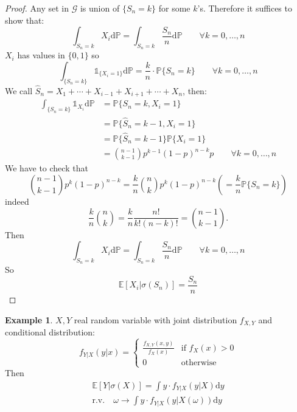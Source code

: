 \documentclass[10pt,a4paper]{article}
\theoremstyle{definition}
\newtheorem{exi}{Example}[section]
\newcommand{\ind}{\mathds{1}}
\begin{document}
\begin{proof}
Any set in $\mathcal{G}$ is union of $\{S_n=k\}$ for some $k$'s. Therefore it suffices to show that:
\begin{equation*}
	\int_{{S_n=k}}X_i\mathrm{d}\mathbb{P} = \int_{{S_n=k}}\frac{S_n}{n}\mathrm{d}\mathbb{P}  \qquad    \forall k=0,\ldots,n
\end{equation*}
$ X_i  $ has values in $ \{0,1\} $ so
\begin{equation*}
	\int_{\{S_n=k\}}\ind_{\{X_i=1\}}\mathrm{d}\mathbb{P} = \frac{k}{n}\cdot\mathbb{P}\{S_n=k\}   \qquad   \forall k=0,\ldots,n
\end{equation*}
We call $\hat{S}_n=X_1+\cdots+X_{i-1}+X_{i+1}+\cdots+X_n$, then:
\begin{equation*}
	\begin{split}
	\int_{\{S_n=k\}}\ind_{X_i}\mathrm{d}\mathbb{P} & = \mathbb{P}\{S_n=k,X_i=1\}\\
	&=\mathbb{P}\{\hat{S}_n=k-1,X_i=1\}\\
	&=\mathbb{P}\{\hat{S}_n=k-1\}\mathbb{P}\{X_i=1\}\\
	  & =\binom{n-1}{k-1}p^{k-1}(1-p)^{n-k}p 
	  \qquad\forall k=0,\ldots,n
   \end{split}
\end{equation*}
We have to check that
\begin{equation*}
	\binom{n-1}{k-1}p^{k}(1-p)^{n-k}=\frac{k}{n}\binom{n}{k}p^{k}(1-p)^{n-k}\left(=\frac{k}{n}\mathbb{P}\{S_n=k\}\right)
\end{equation*}
indeed
\begin{equation*}
	\frac{k}{n}\binom{n}{k}=\frac{k}{n}\frac{n!}{k!(n-k)!}=\binom{n-1}{k-1}.
\end{equation*}
Then
\begin{equation*}
	\int_{{S_n=k}}X_i\mathrm{d}\mathbb{P} = \int_{{S_n=k}}\frac{S_n}{n}\mathrm{d}\mathbb{P}  \qquad    \forall k=0,\ldots,n
\end{equation*}
So
\begin{equation*}
	\mathbb{E}[X_i|\sigma(S_n)]=\frac{S_n}{n}
\end{equation*}

\end{proof}
	\begin{exi}
		$ X,Y $ real random variable with joint distribution $ f_{X,Y} $ and conditional distribution:
		\begin{equation*}
			f_{Y|X}(y|x)=
			\begin{cases}
				\frac{f_{X,Y}(x,y)}{f_X(x)}   &\text{if } f_X(x)>0 \\
				0 & \text{otherwise}
			\end{cases}
		\end{equation*}
	Then
	\begin{equation*}
		\begin{split}
			\mathbb{E}[Y|\sigma(X)]=\int y \cdot f_{Y|X}(y|X)\mathrm{d}y \\
			\mathrm{r.v.} \quad \omega\to\int y\cdot f_{Y|X}(y|X(\omega))\mathrm{d}y
		\end{split}	
	\end{equation*}
	\end{exi}
\end{document}
